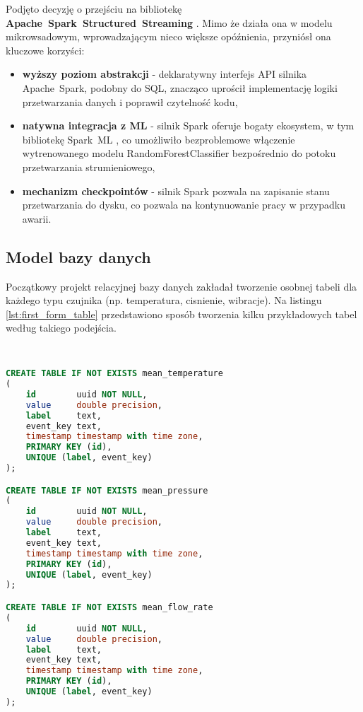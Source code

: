 Podjęto decyzję o przejściu na bibliotekę \textbf{\mbox{Apache Spark Structured Streaming}} \cite{spark_streaming}. Mimo że działa ona w modelu mikrowsadowym, wprowadzającym nieco większe opóźnienia, przyniósł ona kluczowe korzyści:
\begin{itemize}
    \item \textbf{wyższy poziom abstrakcji} - deklaratywny interfejs API silnika \mbox{Apache Spark}, podobny do SQL, znacząco uprościł implementację logiki przetwarzania danych i poprawił czytelność kodu,
    \item \textbf{natywna integracja z ML} - silnik Spark oferuje bogaty ekosystem, w tym bibliotekę \mbox{Spark ML} \cite{spark_streaming}, co umożliwiło bezproblemowe włączenie wytrenowanego modelu RandomForestClassifier bezpośrednio do potoku przetwarzania strumieniowego,
    \item \textbf{mechanizm checkpointów} - silnik Spark pozwala na zapisanie stanu przetwarzania do dysku, co pozwala na kontynuowanie pracy w przypadku awarii.
\end{itemize}

\newpage

\subsection{Model bazy danych}

Początkowy projekt relacyjnej bazy danych zakładał tworzenie osobnej tabeli dla każdego typu czujnika (np. temperatura, cisnienie, wibracje). Na listingu \ref{lst:first_form_table} przedstawiono sposób tworzenia kilku przykładowych tabel według takiego podejścia.

\begin{lstlisting}[caption={Pierwsza forma tabeli w relacyjnej bazie danych}, label={lst:first_form_table},language=SQL]


CREATE TABLE IF NOT EXISTS mean_temperature
(
    id        uuid NOT NULL,
    value     double precision,
    label     text,
    event_key text,
    timestamp timestamp with time zone,
    PRIMARY KEY (id),
    UNIQUE (label, event_key)
);

CREATE TABLE IF NOT EXISTS mean_pressure
(
    id        uuid NOT NULL,
    value     double precision,
    label     text,
    event_key text,
    timestamp timestamp with time zone,
    PRIMARY KEY (id),
    UNIQUE (label, event_key)
);

CREATE TABLE IF NOT EXISTS mean_flow_rate
(
    id        uuid NOT NULL,
    value     double precision,
    label     text,
    event_key text,
    timestamp timestamp with time zone,
    PRIMARY KEY (id),
    UNIQUE (label, event_key)
);

\end{lstlisting}

